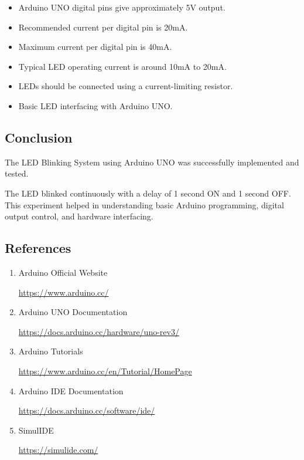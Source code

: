 \begin{itemize}
    \item Arduino UNO digital pins give approximately 5V output.
    \item Recommended current per digital pin is 20mA.
    \item Maximum current per digital pin is 40mA.
    \item Typical LED operating current is around 10mA to 20mA.
    \item LEDs should be connected using a current-limiting resistor.
    \item Basic LED interfacing with Arduino UNO.
\end{itemize}


\subsection{Conclusion}

The LED Blinking System using Arduino UNO was successfully implemented and tested.

The LED blinked continuously with a delay of 1 second ON and 1 second OFF. This experiment helped in understanding basic Arduino programming, digital output control, and hardware interfacing.



\subsection{References}

\begin{enumerate}
    \item Arduino Official Website

    \url{https://www.arduino.cc/}

    \item Arduino UNO Documentation

    \url{https://docs.arduino.cc/hardware/uno-rev3/}

    \item Arduino Tutorials

    \url{https://www.arduino.cc/en/Tutorial/HomePage}

    \item Arduino IDE Documentation

    \url{https://docs.arduino.cc/software/ide/}

    \item SimulIDE

    \url{https://simulide.com/}

    
\end{enumerate}

